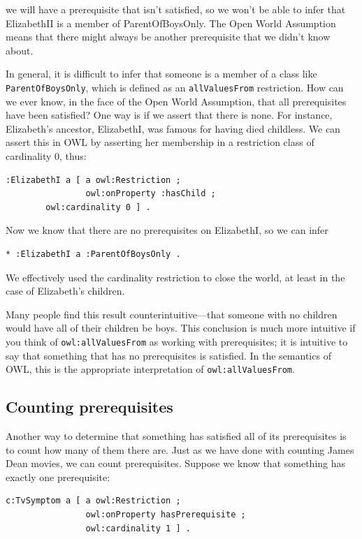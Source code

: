 we will have a prerequisite that isn't satisfied, so we won't be able to
infer that ElizabethII is a member of ParentOfBoysOnly. The Open World
Assumption means that there might always be another prerequisite that we
didn't know about.

In general, it is difficult to infer that someone is a member of a class
like \texttt{ParentOfBoysOnly}, which is defined as an \texttt{allValuesFrom} restriction.
How can we ever know, in the face of the Open World Assumption, that all
prerequisites have been satisfied? One way is if we assert that there is
none. For instance, Elizabeth's ancestor, ElizabethI, was famous for
having died childless. We can assert this in OWL by asserting her
membership in a restriction class of cardinality 0, thus:

\begin{lstlisting}
:ElizabethI a [ a owl:Restriction ;
                owl:onProperty :hasChild ;
		owl:cardinality 0 ] .
\end{lstlisting}

Now we know that there are no prerequisites on ElizabethI, so we can
infer

\begin{lstlisting}
* :ElizabethI a :ParentOfBoysOnly .
\end{lstlisting}

We effectively used the cardinality restriction to close the world, at
least in the case of Elizabeth's children.

Many people find this result counterintuitive---that someone with no
children would have all of their children be boys. This conclusion is
much more intuitive if you think of \texttt{owl:allValuesFrom} as working with
prerequisites; it is intuitive to say that something that has no
prerequisites is satisfied. In the semantics of OWL, this is the
appropriate interpretation of \texttt{owl:allValuesFrom}.

\subsection{Counting prerequisites}

Another way to determine that something has satisfied all of its
prerequisites is to count how many of them there are. Just as we have
done with counting James Dean movies, we can count prerequisites.
Suppose we know that something has exactly one prerequisite:

\begin{lstlisting}
c:TvSymptom a [ a owl:Restriction ;
                owl:onProperty hasPrerequisite ;
                owl:cardinality 1 ] .
\end{lstlisting}

